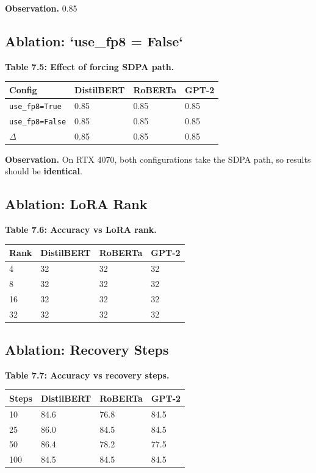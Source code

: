 \textbf{Observation.} 0.85

\subsection{Ablation: `use\_fp8 = False`}

\textbf{Table 7.5: Effect of forcing SDPA path.}

\begin{table}[H]
\centering
\small
\begin{tabular}{llll}
\toprule
\textbf{Config} & \textbf{DistilBERT} & \textbf{RoBERTa} & \textbf{GPT-2} \\
\midrule
\texttt{use\_fp8=True} & 0.85 & 0.85 & 0.85 \\
\texttt{use\_fp8=False} & 0.85 & 0.85 & 0.85 \\
$\Delta$ & 0.85 & 0.85 & 0.85 \\
\bottomrule
\end{tabular}
\end{table}

\textbf{Observation.} On RTX 4070, both configurations take the SDPA path, so 
results should be \textbf{identical}.

\subsection{Ablation: LoRA Rank}

\textbf{Table 7.6: Accuracy vs LoRA rank.}

\begin{table}[H]
\centering
\small
\begin{tabular}{llll}
\toprule
\textbf{Rank} & \textbf{DistilBERT} & \textbf{RoBERTa} & \textbf{GPT-2} \\
\midrule
4 & 32 & 32 & 32 \\
8 & 32 & 32 & 32 \\
16 & 32 & 32 & 32 \\
32 & 32 & 32 & 32 \\
\bottomrule
\end{tabular}
\end{table}

\subsection{Ablation: Recovery Steps}

\textbf{Table 7.7: Accuracy vs recovery steps.}

\begin{table}[H]
\centering
\small
\begin{tabular}{llll}
\toprule
\textbf{Steps} & \textbf{DistilBERT} & \textbf{RoBERTa} & \textbf{GPT-2} \\
\midrule
10 & 84.6 & 76.8 & 84.5 \\
25 & 86.0 & 84.5 & 84.5 \\
50 & 86.4 & 78.2 & 77.5 \\
100 & 84.5 & 84.5 & 84.5 \\
\bottomrule
\end{tabular}
\end{table}

